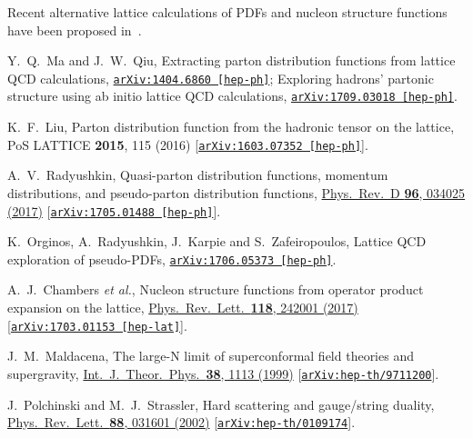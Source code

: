 \documentclass[aps,prd,preprint,groupedaddress]{revtex4-1}
\begin{document}
\begin{thebibliography}{99}
{  
Recent alternative lattice calculations of PDFs and nucleon structure functions have been proposed in~\cite{Ma:2014jla, Liu:2016djw, Radyushkin:2017cyf, Orginos:2017kos, Chambers:2017dov}. 
  
  
  Y.~Q.~Ma and J.~W.~Qiu,
  Extracting parton distribution functions from lattice QCD calculations,
 \href{https://arxiv.org/abs/1404.6860}{\tt arXiv:1404.6860 [hep-ph]};
 Exploring hadrons' partonic structure using ab initio lattice QCD calculations,
 \href{https://arxiv.org/abs/1709.03018}{\tt arXiv:1709.03018 [hep-ph]}.


  K.~F.~Liu,
  Parton distribution function from the hadronic tensor on the lattice,
  PoS LATTICE {\bf 2015}, 115 (2016)
  [\href{https://arxiv.org/abs/1603.07352}{\tt arXiv:1603.07352 [hep-ph]}].
  
  
  A.~V.~Radyushkin,
  Quasi-parton distribution functions, momentum distributions, and pseudo-parton distribution functions,
  \href{https://journals.aps.org/prd/abstract/10.1103/PhysRevD.96.034025}{Phys.\ Rev.\ D {\bf 96}, 034025 (2017)}
  [\href{https://arxiv.org/abs/1705.01488}{\tt arXiv:1705.01488 [hep-ph]}].  
  
  
  K.~Orginos, A.~Radyushkin, J.~Karpie and S.~Zafeiropoulos,
  Lattice QCD exploration of pseudo-PDFs,
  \href{https://arxiv.org/abs/1706.05373}{\tt arXiv:1706.05373 [hep-ph]}.  
  
 
  A.~J.~Chambers {\it et al.},
  Nucleon structure functions from operator product expansion on the lattice,
  \href{https://journals.aps.org/prl/abstract/10.1103/PhysRevLett.118.242001}{Phys.\ Rev.\ Lett.\  {\bf 118}, 242001 (2017)}
  [\href{https://arxiv.org/abs/1703.01153}{\tt arXiv:1703.01153 [hep-lat]}]. 
  }

 J.~M.~Maldacena,
 The large-N limit of superconformal field theories and supergravity,
 \href{http://www.springerlink.com/content/q508214382421612/}{Int.\ J.\ Theor.\ Phys.\  {\bf 38}, 1113 (1999)}
 [\href{http://arXiv.org/abs/hep-th/9711200}{\tt arXiv:hep-th/9711200}].


  J.~Polchinski and M.~J.~Strassler,
 Hard scattering and gauge/string duality,
  \href{http://prl.aps.org/abstract/PRL/v88/i3/e031601}{Phys.\ Rev.\ Lett.\  {\bf 88}, 031601 (2002)}
  [\href{http://arXiv.org/abs/hep-th/0109174}{\tt arXiv:hep-th/0109174}].



\end{thebibliography}
\end{document}
